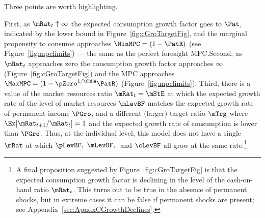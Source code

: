 \documentclass[ProjectDLO]{subfiles}
\begin{document}
Three points are worth highlighting.  %

First, as $\mRat_{t} \uparrow \infty$ the expected consumption growth factor goes to ${\Pat}$, indicated by the lower bound in Figure~\ref{fig:cGroTargetFig}, and the marginal propensity to consume approaches $\MinMPC=(1-\PatR)$ (see Figure~\ref{fig:mpclimits}) --- the same as the perfect foresight MPC.\@  Second, as $\mRat_{t}$ approaches zero the consumption growth factor approaches $\infty$ (Figure~\ref{fig:cGroTargetFig}) and the MPC approaches $\MaxMPC=(1-\pZero^{1/\CRRA}\PatR)$ (Figure~\ref{fig:mpclimits}).  Third, there is a value of the market resources ratio $\mRat_{t} = \mStE$ at which the expected growth rate of the level of market resources $\mLevBF$ matches the expected growth rate of permanent income $\PGro$, and a different (larger) target ratio $\mTrg$ where $\Ex[\mRat_{t+1}/\mRat_{t}]=1$ and the expected growth rate of consumption is lower than $\PGro$.  Thus, at the individual level, this model does not have a single $\mRat$ at which $\pLevBF,~\mLevBF,~$ and $\cLevBF$ all grow at the same rate.\footnote{A final proposition suggested by Figure~\ref{fig:cGroTargetFig} is that the expected consumption growth factor is declining in the level of the cash-on-hand ratio $\mRat_{t}$.  This turns out to be true in the absence of permanent shocks, but in extreme cases it can be false if permanent shocks are present; see Appendix~\ref{sec:ApndxCGrowthDeclines}.}
\end{document}
